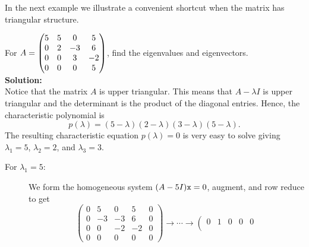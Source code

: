In the next example we illustrate a convenient shortcut when the matrix has triangular
structure.
\begin{example}
For $A = \begin{pmatrix} 5 & 5 & 0 & 5 \\0 & 2 & -3 & 6 \\ 0 & 0 & 3 & -2 \\0 & 0 & 0 & 5 \end{pmatrix}$, find
the eigenvalues and eigenvectors.
\\{\bf Solution:}\\
Notice that the matrix $A$ is upper triangular.  This means that $A-\lambda I$ is upper
triangular and the determinant is the product of the diagonal entries.  Hence, the
characteristic polynomial is
\[ p(\lambda) = (5-\lambda)(2-\lambda)(3-\lambda)(5-\lambda). \]
The resulting characteristic equation $p(\lambda)=0$ is very easy to solve giving
$\lambda_1 = 5$, $\lambda_2 = 2$, and $\lambda_3=3$.
\begin{description}
    \item[For $\lambda_1=5$:] We form the homogeneous system $(A-5I)\texttt{x} = 0$,
        augment, and row reduce to get
        \[ \left( \begin{array}{cccc|c} 0 & 5 & 0 & 5 & 0 \\
                                        0 & -3 & -3 & 6& 0 \\
                                        0 & 0 & -2 & -2 & 0 \\
                                        0 & 0 & 0 & 0 & 0 \end{array} \right) 
        \to \cdots \to
        \left( \begin{array}{cccc|c} 0 & 1 & 0 & 0 & 0 \\

\end{array}\]
\end{description}
\end{example}
